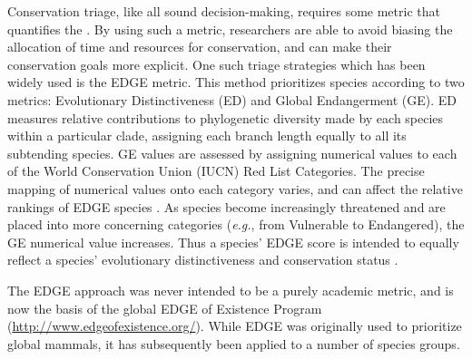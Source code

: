 \documentclass[12pt,english]{article}
\begin{document}
Conservation triage, like all sound decision-making, requires some
metric that quantifies the . By using such a metric, researchers
are able to avoid biasing the allocation of time and resources for
conservation, and can make their conservation goals more explicit.
One such triage strategies which has been widely used is the EDGE
metric\autocite[Evolutionary Distinction and Globally
Endangered;][]{Isaac2007}. This method prioritizes species according
to two metrics: Evolutionary Distinctiveness (ED) and Global
Endangerment (GE).
ED measures relative contributions to phylogenetic
diversity made by each species within a particular
clade\autocite{Isaac2007}, assigning each branch length equally to all
its subtending species.
GE values are assessed by
assigning numerical values to each of the World Conservation Union
(IUCN) Red List Categories.
The precise mapping of numerical values onto each category varies, and
can affect the relative rankings of EDGE species \autocite{Mooers2008}.
{As species become increasingly
threatened and are placed into more concerning categories
(\emph{e.g.}, from Vulnerable to Endangered), the GE numerical value
increases.} Thus a species' EDGE score is intended to equally reflect a species'
evolutionary distinctiveness and conservation status \autocite[but
see][for discussion on this]{Pearse2015}.

The EDGE approach was never intended to be a purely academic metric,
and is now the basis of the global EDGE of Existence Program
(\url{http://www.edgeofexistence.org/}). While EDGE was originally used to prioritize global mammals, it has subsequently been applied to a number of species groups.
\end{document}
